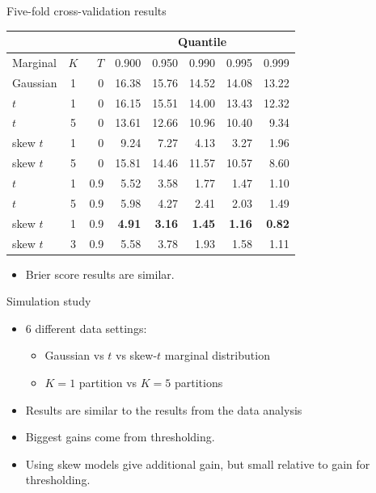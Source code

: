 \documentclass{beamer}
\begin{document}
\begin{frame}{Five-fold cross-validation results}
  \begin{table}[htbp]
    \small
    \centering
    \begin{tabular}{l|c|r|rrrrr}
          \multicolumn{3}{c}{\ } & \multicolumn{5}{c}{Quantile}\\
           \hline
  Marginal & $K$ & $T$  & 0.900 & 0.950 & 0.990 & 0.995 & 0.999\\
  \hline
Gaussian & 1 & 0 & 16.38 & 15.76 & 14.52 & 14.08 & 13.22\\
$t$ & 1 & 0 & 16.15 & 15.51 & 14.00 & 13.43 & 12.32\\
$t$ & 5 & 0 & 13.61 & 12.66 & 10.96 & 10.40 & 9.34\\
skew $t$ & 1 & 0 & 9.24  & 7.27 & 4.13  & 3.27  & 1.96\\
skew $t$ & 5 & 0 & 15.81 & 14.46 & 11.57 & 10.57 & 8.60\\
$t$ & 1 & 0.9 & 5.52  & 3.58  & 1.77  & 1.47  & 1.10\\
$t$ & 5 & 0.9 & 5.98  & 4.27  & 2.41  & 2.03  & 1.49\\
 skew $t$ & 1 & 0.9 & {\bf 4.91}  & {\bf 3.16} & {\bf 1.45}  & {\bf 1.16}  & {\bf 0.82}\\
skew $t$ & 3 & 0.9 & 5.58 & 3.78 & 1.93& 1.58& 1.11\\
\hline
    \end{tabular}
  \end{table}
  \begin{itemize}
  	\item Brier score results are similar.
  \end{itemize}
\end{frame}

\begin{frame}{Simulation study}
  \begin{itemize} \setlength{\itemsep}{0.5em}
    \item 6 different data settings:
    \begin{itemize}
    	\item Gaussian vs $t$ vs skew-$t$ marginal distribution
        \item $K=1$ partition vs $K=5$ partitions
    \end{itemize}
    \item Results are similar to the results from the data analysis
    \item Biggest gains come from thresholding.
    \item Using skew models give additional gain, but small relative to gain for thresholding.
  \end{itemize}
\end{frame}
\end{document}
